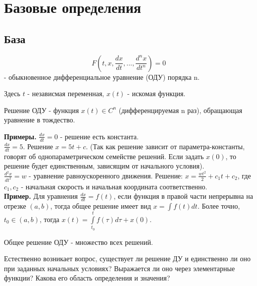 \section{Базовые определения}
\subsection{База}
\begin{defin}
\begin{equation}
    F(t,x,\frac{dx}{dt},...,\frac{d^n x}{dt^n})=0 \label{ODE}
\end{equation}
- обыкновенное дифференциальное уравнение (ОДУ) порядка n.
\end{defin}
Здесь $t$ - независмая переменная,  $x(t)$ - искомая функция.
\begin{defin}
Решение ОДУ - функция $x(t)\in C^n$ (дифференцируемая n раз), обращающая
уравнение в тождество.
\end{defin}
\textbf{Примеры.} $\frac{dx}{dt}=0 $ - решение есть константа.\\
$\frac{dx}{dt}=5$. Решение $x=5t+c$.
(Так как решение зависит от параметра-константы, говорят об однопараметрическом
семействе решений. Если задать $x(0)$, то решение будет единственным, 
зависящим от начального условия).\\
$\frac{d^2 x}{dt^2}=w$ - уравнение равноускоренного 
движения. Решение: $x=\frac{wt^2}{2}+c_1t+c_2$, где  $c_1,c_2$ - начальная 
скорость и начальная координата соответственно. \\
\textbf{Пример.} Для уравнения $\frac{dx}{dt} =f(t)$, если 
функция в правой части непрерывна на отрезке $(a,b)$, тогда общее решение
имеет вид $x=\int f(t)dt$. Более точно, $t_0\in(a,b)$, тогда
$x(t)=\int\limits^t_{t_0}f(\tau)d\tau+x(0)$.
\begin{defin}
Общее решение ОДУ - множество всех решений.
\end{defin}
Естественно возникает вопрос, существует ли решение ДУ и единственно ли оно
при заданных начальных условиях? Выражается ли оно через элементарные функции?
Какова его область определения и значения?

